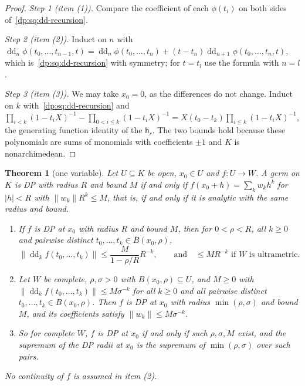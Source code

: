 \documentclass[11pt]{amsart}
\newtheorem{theorem}{Theorem}[section]
\theoremstyle{definition}
\theoremstyle{remark}
\numberwithin{equation}{section}
\newcommand{\abs}[1]{\lvert #1\rvert}
\newcommand{\norm}[1]{\lVert #1\rVert}
\theoremstyle{plain}
\theoremstyle{definition}
\theoremstyle{plain}
\begin{document}
\begin{proof}
\emph{Step 1 (item (1)).} Compare the coefficient of each $\phi(t_i)$ on both sides of~\eqref{dp:sq:dd-recursion}.

\emph{Step 2 (item (2)).} Induct on $n$ with $\operatorname{dd}_n\phi(t_0,\dots,t_{n-1},t)=\operatorname{dd}_n\phi(t_0,\dots,t_n)+(t-t_n)\operatorname{dd}_{n+1}\phi(t_0,\dots,t_n,t)$, which is~\eqref{dp:sq:dd-recursion} with symmetry; for $t=t_l$ use the formula with $n=l$.

\emph{Step 3 (item (3)).} We may take $x_0=0$, as the differences do not change. Induct on $k$ with~\eqref{dp:sq:dd-recursion} and $\prod_{i<k}(1-t_iX)^{-1}-\prod_{0<i\le k}(1-t_iX)^{-1}=X(t_0-t_k)\prod_{i\le k}(1-t_iX)^{-1}$, the generating function identity of the $\mathsf h_r$. The two bounds hold because these polynomials are sums of monomials with coefficients $\pm1$ and $K$ is nonarchimedean.
\end{proof}

\begin{theorem}[one variable]\label{dp:thm:divided-one}
Let $U\subseteq K$ be open, $x_0\in U$ and $f\colon U\to W$. A germ on $K$ is DP with radius $R$ and bound $M$ if and only if $f(x_0+h)=\sum_kw_kh^k$ for $\abs h<R$ with $\norm{w_k}R^k\le M$, that is, if and only if it is analytic with the same radius and bound.
\begin{enumerate}
\item If $f$ is DP at $x_0$ with radius $R$ and bound $M$, then for $0<\rho<R$, all $k\ge0$ and pairwise distinct $t_0,\dots,t_k\in\bar B(x_0,\rho)$,
\begin{equation}\label{dp:sq:one-variable-bound}
 \norm{\operatorname{dd}_kf(t_0,\dots,t_k)}\le\frac{M}{1-\rho/R}R^{-k},\qquad\text{and}\quad\le MR^{-k}\text{ if $W$ is ultrametric}.
\end{equation}
\item Let $W$ be complete, $\rho,\sigma>0$ with $B(x_0,\rho)\subseteq U$, and $M\ge0$ with $\norm{\operatorname{dd}_kf(t_0,\dots,t_k)}\le M\sigma^{-k}$ for all $k\ge0$ and all pairwise distinct $t_0,\dots,t_k\in B(x_0,\rho)$. Then $f$ is DP at $x_0$ with radius $\min(\rho,\sigma)$ and bound $M$, and its coefficients satisfy $\norm{w_k}\le M\sigma^{-k}$.
\item So for complete $W$, $f$ is DP at $x_0$ if and only if such $\rho,\sigma,M$ exist, and the supremum of the DP radii at $x_0$ is the supremum of $\min(\rho,\sigma)$ over such pairs.
\end{enumerate}
No continuity of $f$ is assumed in item \textup{(2)}.
\end{theorem}
\end{document}
